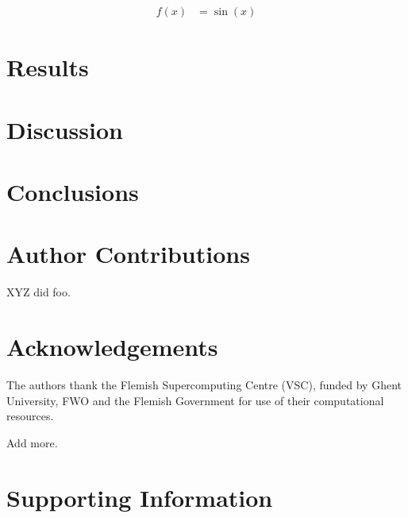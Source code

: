 \documentclass[11pt]{article}
\begin{document}
    \begin{align}
        f(x) &= \sin(x)
    \end{align}

    \section{Results}
    \label{sec:results}

    \section{Discussion}
    \label{sec:discussion}

    \section{Conclusions}
    \label{sec:conclusions}

    \section*{Author Contributions}
    \label{sec:author-contributions}

    XYZ did foo.

    \section*{Acknowledgements}
    \label{sec:acknowledgements}

    The authors thank the Flemish Supercomputing Centre (VSC),
    funded by Ghent University,
    FWO and the Flemish Government for use of their computational resources.

    Add more.

    \section*{Supporting Information}
    \label{sec:suppinfo}

    
    
\end{document}
